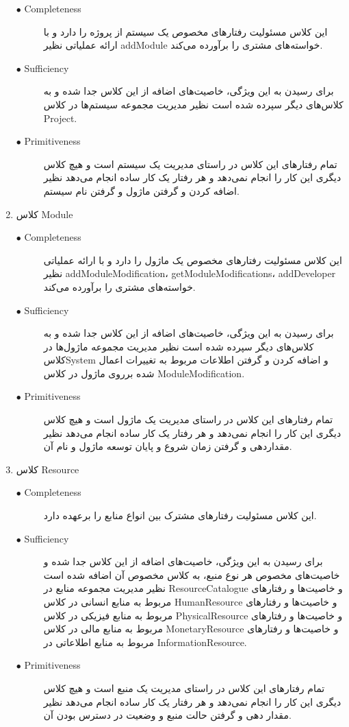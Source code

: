 \begin{enumerate}
\begin{description}
\item[$\bullet$ Completeness]  این کلاس مسئولیت رفتارهای مخصوص یک سیستم از پروژه را دارد و با ارائه عملیاتی نظیر addModule خواسته‌های مشتری را برآورده می‌کند.
\par
\item[$\bullet$ Sufficiency] برای رسیدن به این ویژگی، خاصیت‌های اضافه از این کلاس جدا شده و به کلاس‌های دیگر سپرده شده است نظیر مدیریت مجموعه سیستم‌ها در کلاس Project.
\par
\item[$\bullet$ Primitiveness] تمام رفتارهای این کلاس در راستای مدیریت یک سیستم است و هیچ کلاس دیگری این کار را انجام نمی‌دهد و هر رفتار یک کار ساده انجام می‌دهد نظیر اضافه کردن و گرفتن ماژول و گرفتن نام سیستم. 
\end{description}

\item کلاس Module

\begin{description}
\item[$\bullet$ Completeness]  این کلاس مسئولیت رفتارهای مخصوص یک ماژول را دارد و با ارائه عملیاتی نظیر addModuleModification، getModuleModifications، addDeveloper خواسته‌های مشتری را برآورده می‌کند.
\par
\item[$\bullet$ Sufficiency] برای رسیدن به این ویژگی، خاصیت‌های اضافه از این کلاس جدا شده و به کلاس‌های دیگر سپرده شده است نظیر مدیریت مجموعه ماژول‌ها در کلاسSystem  و اضافه کردن و گرفتن اطلاعات مربوط به تغییرات اعمال شده برروی ماژول در کلاس ModuleModification.
\par
\item[$\bullet$ Primitiveness] تمام رفتارهای این کلاس در راستای مدیریت یک ماژول است و هیچ کلاس دیگری این کار را انجام نمی‌دهد و هر رفتار یک کار ساده انجام می‌دهد نظیر مقداردهی و گرفتن زمان شروع و پایان توسعه ماژول و نام آن. 
\end{description}

\item کلاس Resource

\begin{description}
\item[$\bullet$ Completeness] این کلاس مسئولیت رفتارهای مشترک بین انواع منابع را برعهده دارد.
\par
\item[$\bullet$ Sufficiency] برای رسیدن به این ویژگی، خاصیت‌های اضافه‌ از این کلاس جدا شده و خاصیت‌های مخصوص هر نوع منبع، به کلاس مخصوص آن اضافه شده است نظیر مدیریت مجموعه منابع در ResourceCatalogue و خاصیت‌ها و رفتارهای مربوط به منابع انسانی در کلاس HumanResource و خاصیت‌ها و رفتارهای مربوط به منابع فیزیکی در کلاس PhysicalResource و خاصیت‌ها و رفتارهای مربوط به منابع مالی در کلاس MonetaryResource و خاصیت‌ها و رفتارهای مربوط به منابع اطلاعاتی در InformationResource.
\par
\item[$\bullet$ Primitiveness] تمام رفتارهای این کلاس در راستای مدیریت یک منبع است و هیچ کلاس دیگری این کار را انجام نمی‌دهد و هر رفتار یک کار ساده انجام می‌دهد نظیر مقدار دهی و گرفتن حالت منبع و وضعیت در دسترس بودن آن. 
\end{description}

\end{enumerate}
